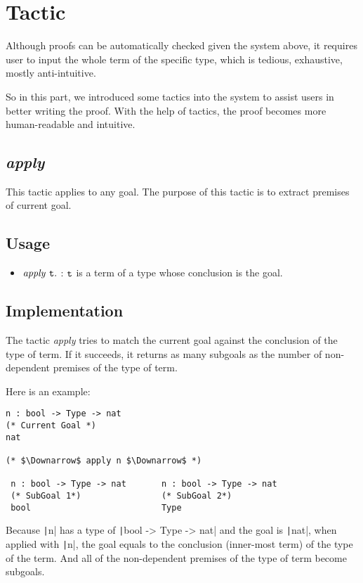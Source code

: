 \section{Tactic}
Although proofs can be automatically checked given the system above, it requires user to input the whole
term of the specific type, which is tedious, exhaustive, mostly anti-intuitive.\par
So in this part, we introduced some tactics into the system 
to assist users in better writing the proof. With the help of
tactics, the proof becomes more human-readable and intuitive.\par

\subsection{\it apply}
This tactic applies to any goal. The purpose of this tactic is to extract premises of
current goal.

\subsection*{Usage}
\begin{itemize}
\item $\it apply\ \tt t.$ : $\tt t$ is a term of a type whose conclusion is the goal.
\end{itemize}

\subsection*{Implementation}
The tactic {\it apply} tries to match the current goal against the 
conclusion of the type of term. 
If it succeeds, it returns as many subgoals as 
the number of non-dependent premises of the type of term.\par
Here is an example:
\begin{center}
\begin{verbatim}
n : bool -> Type -> nat                   
(* Current Goal *)      
nat                                       

(* $\Downarrow$ apply n $\Downarrow$ *)   

 n : bool -> Type -> nat       n : bool -> Type -> nat
 (* SubGoal 1*)                (* SubGoal 2*)          
 bool                          Type
\end{verbatim}
\end{center}
Because \texttt|n| has a type of \texttt|bool -> Type -> nat| 
and the goal is \texttt|nat|,
when applied with \texttt|n|,
the goal equals to the conclusion (inner-most term) of the type of the term.
And all of the non-dependent premises of the type of term become subgoals.

